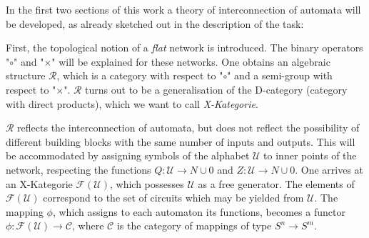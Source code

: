 \documentclass{article}
\begin{document}
In the first two sections of this work a theory of interconnection of automata will be developed, as already sketched out in the description of the task:

First, the topological notion of a \emph{flat} network is introduced. The binary operators "$\circ$" and "$\times$" will be explained for these networks. One obtains an algebraic structure $\mathcal{R}$, which is a category with respect to "$\circ$" and a semi-group with respect to "$\times$". $\mathcal{R}$ turns out to be a generalisation of the D-category (category with direct products), which we want to call \emph{X-Kategorie}.

$\mathcal{R}$ reflects the interconnection of automata, but does not reflect the possibility of different building blocks with the same number of inputs and outputs. This will be accommodated by assigning symbols of the alphabet $\mathcal{U}$ to inner points of the network, respecting the functions $Q : \mathcal{U} \rightarrow N \cup {0}$ and $Z : \mathcal{U} \rightarrow N \cup {0}$. One arrives at an X-Kategorie $\mathcal{F}(\mathcal{U})$, which possesses $\mathcal{U}$ as a free generator. The
elements of $\mathcal{F}(\mathcal{U})$ correspond to the set of circuits which may be yielded from $\mathcal{U}$. The mapping $\phi$, which assigns to each automaton its functions, becomes a functor $\phi:\mathcal{F}(\mathcal{U}) \rightarrow \mathcal{C}$, where $\mathcal{C}$ is the category of mappings of type $S^n \rightarrow S^m$. 
\end{document}
